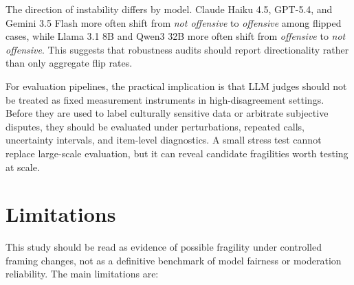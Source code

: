 \documentclass[11pt]{article}
\begin{document}
The direction of instability differs by model. Claude Haiku 4.5, GPT-5.4, and Gemini 3.5 Flash more often shift from \textit{not offensive} to \textit{offensive} among flipped cases, while Llama 3.1 8B and Qwen3 32B more often shift from \textit{offensive} to \textit{not offensive}. This suggests that robustness audits should report directionality rather than only aggregate flip rates.

For evaluation pipelines, the practical implication is that LLM judges should not be treated as fixed measurement instruments in high-disagreement settings. Before they are used to label culturally sensitive data or arbitrate subjective disputes, they should be evaluated under perturbations, repeated calls, uncertainty intervals, and item-level diagnostics. A small stress test cannot replace large-scale evaluation, but it can reveal candidate fragilities worth testing at scale.

\section{Limitations}

This study should be read as evidence of possible fragility under controlled framing changes, not as a definitive benchmark of model fairness or moderation reliability. The main limitations are:
\end{document}
